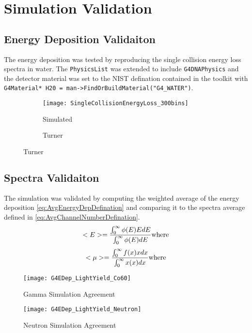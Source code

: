 \section{Simulation Validation}
\label{sec:SimValidation}

\subsection{Energy Deposition Validaiton}
The energy deposition was tested by reproducing the single collision energy loss spectra in water.
The \verb+PhysicsList+ was extended to include \verb+G4DNAPhysics+ and the detector material was set to the NIST defination contained in the toolkit with \verb+G4Material* H20 = man->FindOrBuildMaterial("G4_WATER")+.

\begin{figure}
    \centering
    \caption{Single Collision Energy Loss of Water}
    \begin{subfigure}[b]{0.45\figurewidth}
        \texttt{[image: SingleCollisionEnergyLoss\_300bins]}
        \caption{Simulated}
    \end{subfigure}
    \begin{subfigure}[b]{0.45\figurewidth}
        \caption{Turner}
    \end{subfigure}
\end{figure}
\subsection{Spectra Validaiton}
The simulation was validated by computing the weighted average of the energy deposition \ref{eq:AvgEnergyDepDefination} and comparing it to the spectra average defined in \ref{eq:AvgChannelNumberDefination}.
\begin{equation}
\label{eq:AvgEnergyDepDefination}
<E> = \frac{\int_0^\infty {\phi(E)EdE}}{\int_0^\infty{\phi(E)dE}} \\
\text{where}
\end{equation}
\begin{equation}
\label{eq:AvgChannelNumberDefination}
<\mu> = \frac{\int_0^\infty {f(x)xdx}}{\int_0^\infty{x(x)dx}} \\
\text{where}
\end{equation}
\begin{figure}
    \centering
    \caption{Gamma Simulation Agreement}
    \texttt{[image: G4EDep\_LightYield\_Co60]}
    \label{fig:GammaSimAgreement}
\end{figure}
\begin{figure}
    \centering
    \caption{Neutron Simulation Agreement}
    \texttt{[image: G4EDep\_LightYield\_Neutron]}
    \label{fig:NeutronSimAgreement}
\end{figure}

